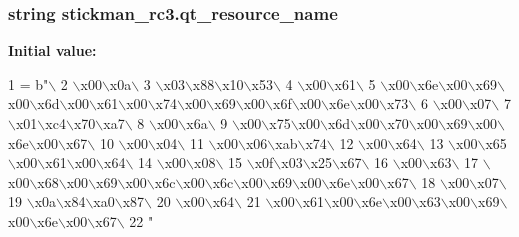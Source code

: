 \subsubsection[{qt\+\_\+resource\+\_\+name}]{\setlength{\rightskip}{0pt plus 5cm}string stickman\+\_\+rc3.\+qt\+\_\+resource\+\_\+name}\label{namespacestickman__rc3_a1db3e8f6e133c463cf18a0804d0b5817}
{\bfseries Initial value\+:}
\begin{DoxyCode}
1 = b\textcolor{stringliteral}{"\(\backslash\)}
2 \textcolor{stringliteral}{\(\backslash\)x00\(\backslash\)x0a\(\backslash\)}
3 \textcolor{stringliteral}{\(\backslash\)x03\(\backslash\)x88\(\backslash\)x10\(\backslash\)x53\(\backslash\)}
4 \textcolor{stringliteral}{\(\backslash\)x00\(\backslash\)x61\(\backslash\)}
5 \textcolor{stringliteral}{\(\backslash\)x00\(\backslash\)x6e\(\backslash\)x00\(\backslash\)x69\(\backslash\)x00\(\backslash\)x6d\(\backslash\)x00\(\backslash\)x61\(\backslash\)x00\(\backslash\)x74\(\backslash\)x00\(\backslash\)x69\(\backslash\)x00\(\backslash\)x6f\(\backslash\)x00\(\backslash\)x6e\(\backslash\)x00\(\backslash\)x73\(\backslash\)}
6 \textcolor{stringliteral}{\(\backslash\)x00\(\backslash\)x07\(\backslash\)}
7 \textcolor{stringliteral}{\(\backslash\)x01\(\backslash\)xc4\(\backslash\)x70\(\backslash\)xa7\(\backslash\)}
8 \textcolor{stringliteral}{\(\backslash\)x00\(\backslash\)x6a\(\backslash\)}
9 \textcolor{stringliteral}{\(\backslash\)x00\(\backslash\)x75\(\backslash\)x00\(\backslash\)x6d\(\backslash\)x00\(\backslash\)x70\(\backslash\)x00\(\backslash\)x69\(\backslash\)x00\(\backslash\)x6e\(\backslash\)x00\(\backslash\)x67\(\backslash\)}
10 \textcolor{stringliteral}{\(\backslash\)x00\(\backslash\)x04\(\backslash\)}
11 \textcolor{stringliteral}{\(\backslash\)x00\(\backslash\)x06\(\backslash\)xab\(\backslash\)x74\(\backslash\)}
12 \textcolor{stringliteral}{\(\backslash\)x00\(\backslash\)x64\(\backslash\)}
13 \textcolor{stringliteral}{\(\backslash\)x00\(\backslash\)x65\(\backslash\)x00\(\backslash\)x61\(\backslash\)x00\(\backslash\)x64\(\backslash\)}
14 \textcolor{stringliteral}{\(\backslash\)x00\(\backslash\)x08\(\backslash\)}
15 \textcolor{stringliteral}{\(\backslash\)x0f\(\backslash\)x03\(\backslash\)x25\(\backslash\)x67\(\backslash\)}
16 \textcolor{stringliteral}{\(\backslash\)x00\(\backslash\)x63\(\backslash\)}
17 \textcolor{stringliteral}{\(\backslash\)x00\(\backslash\)x68\(\backslash\)x00\(\backslash\)x69\(\backslash\)x00\(\backslash\)x6c\(\backslash\)x00\(\backslash\)x6c\(\backslash\)x00\(\backslash\)x69\(\backslash\)x00\(\backslash\)x6e\(\backslash\)x00\(\backslash\)x67\(\backslash\)}
18 \textcolor{stringliteral}{\(\backslash\)x00\(\backslash\)x07\(\backslash\)}
19 \textcolor{stringliteral}{\(\backslash\)x0a\(\backslash\)x84\(\backslash\)xa0\(\backslash\)x87\(\backslash\)}
20 \textcolor{stringliteral}{\(\backslash\)x00\(\backslash\)x64\(\backslash\)}
21 \textcolor{stringliteral}{\(\backslash\)x00\(\backslash\)x61\(\backslash\)x00\(\backslash\)x6e\(\backslash\)x00\(\backslash\)x63\(\backslash\)x00\(\backslash\)x69\(\backslash\)x00\(\backslash\)x6e\(\backslash\)x00\(\backslash\)x67\(\backslash\)}
22 \textcolor{stringliteral}{"}
\end{DoxyCode}

